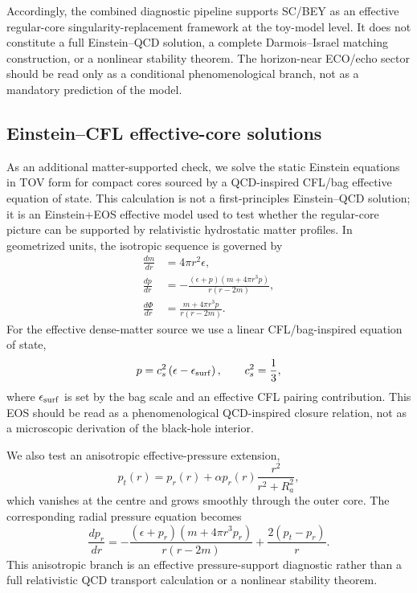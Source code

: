 \documentclass[epj]{svjour}
\begin{document}
Accordingly, the combined diagnostic pipeline supports SC/BEY as an effective
regular-core singularity-replacement framework at the toy-model level. It does
not constitute a full Einstein--QCD solution, a complete Darmois--Israel matching
construction, or a nonlinear stability theorem. The horizon-near ECO/echo sector
should be read only as a conditional phenomenological branch, not as a mandatory
prediction of the model.


\subsection{Einstein--CFL effective-core solutions}
\label{sec:einstein_cfl_effective_solutions}

As an additional matter-supported check, we solve the static Einstein equations
in TOV form for compact cores sourced by a QCD-inspired CFL/bag effective
equation of state. This calculation is not a first-principles Einstein--QCD
solution; it is an Einstein+EOS effective model used to test whether the
regular-core picture can be supported by relativistic hydrostatic matter
profiles. In geometrized units, the isotropic sequence is governed by
\begin{align}
\frac{dm}{dr}&=4\pi r^2\epsilon,
\label{eq:einstein_cfl_tov_mass}\\
\frac{dp}{dr}&=
-\frac{(\epsilon+p)(m+4\pi r^3p)}{r(r-2m)},
\label{eq:einstein_cfl_tov_pressure}\\
\frac{d\Phi}{dr}&=
\frac{m+4\pi r^3p}{r(r-2m)} .
\label{eq:einstein_cfl_tov_phi}
\end{align}
For the effective dense-matter source we use a linear CFL/bag-inspired
equation of state,
\begin{equation}
p=c_s^2\left(\epsilon-\epsilon_{\rm surf}\right),\qquad
c_s^2=\frac{1}{3},
\label{eq:einstein_cfl_linear_eos}
\end{equation}
where \(\epsilon_{\rm surf}\) is set by the bag scale and an effective CFL
pairing contribution. This EOS should be read as a phenomenological
QCD-inspired closure relation, not as a microscopic derivation of the black-hole
interior.

We also test an anisotropic effective-pressure extension,
\begin{equation}
p_t(r)=p_r(r)+\alpha p_r(r)\frac{r^2}{r^2+R_a^2},
\label{eq:einstein_cfl_anisotropy}
\end{equation}
which vanishes at the centre and grows smoothly through the outer core. The
corresponding radial pressure equation becomes
\begin{equation}
\frac{dp_r}{dr}=
-\frac{(\epsilon+p_r)(m+4\pi r^3p_r)}{r(r-2m)}
+\frac{2(p_t-p_r)}{r}.
\label{eq:einstein_cfl_anisotropic_tov}
\end{equation}
This anisotropic branch is an effective pressure-support diagnostic rather than
a full relativistic QCD transport calculation or a nonlinear stability theorem.
\end{document}
